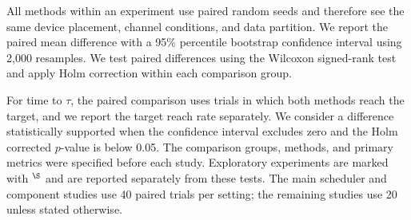 \documentclass[conference]{IEEEtran}
\begin{document}
All methods within an experiment use paired random seeds and therefore see the
same device placement, channel conditions, and data partition. We report the
paired mean difference with a 95\% percentile bootstrap confidence interval
using 2,000 resamples. We test paired differences using the Wilcoxon signed-rank
test and apply Holm correction within each comparison group.

For time to \(\tau\), the paired comparison uses trials in which both methods
reach the target, and we report the target reach rate separately. We consider a
difference statistically supported when the confidence interval excludes zero
and the Holm corrected \(p\)-value is below 0.05. The comparison groups,
methods, and primary metrics were specified before each study. Exploratory
experiments are marked with \(^{\S}\) and are reported separately from these
tests. The main scheduler and component studies use 40 paired trials per
setting; the remaining studies use 20 unless stated otherwise.





\end{document}
